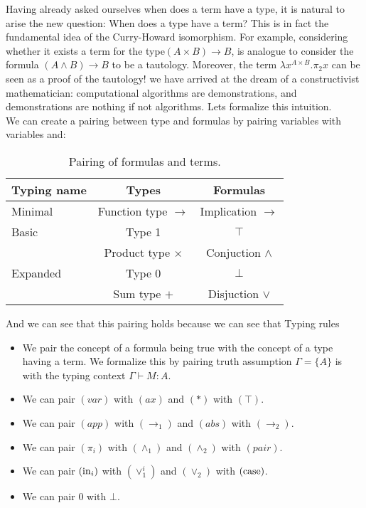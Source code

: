 Having already asked ourselves when does a term have a type, it is natural to arise the new question: When does a type have a term? This is in fact the fundamental idea of the Curry-Howard isomorphism. For example, considering whether it exists a term for the type$(A \times B) \to B$, is analogue to consider the formula $(A\land B)\to B$ to be a tautology. Moreover, the term $\lambda x^{A\times B}. \pi_2 x$ can be seen as a proof of the tautology! we have arrived at the dream of a constructivist mathematician: computational algorithms are demonstrations, and demonstrations are nothing if not algorithms. Lets formalize this intuition.\\


We can create a pairing between type and formulas by pairing variables with variables and:
\begin{table}[!h]
\begin{center}
\begin{tabular}{|l|c|c|}
\hline
  Typing name & Types  & Formulas  \\
  \hline
  Minimal     & Function type $\to$   & Implication $\to$  \\
  \hline 
  Basic      & Type 1 & $\top$ \\
             & Product type $\times$ & Conjuction $\land$ \\
  \hline
  Expanded   & Type 0 & $\bot$ \\
             & Sum type $+$     & Disjuction $\lor$ \\
\hline
\end{tabular}
\caption*{\label{tab:table-name} Pairing of formulas and terms.}
\end{center}
\end{table}

And we can see that this pairing holds because we can see that Typing rules 

\begin{itemize}
\item We pair the concept of a formula being true with the concept of a type having a term. We formalize this by pairing truth assumption $\Gamma=\{A\}$ is with the typing context $\Gamma\vdash M:A$. 
\item We can pair $(var)$ with $(ax)$ and $(*)$ with $(\top)$.
\item We can pair $(app)$ with $(\to_1)$ and $(abs)$ with $(\to_2)$.
\item We can pair $(\pi_i)$ with $(\land_1)$ and $(\land_2)$ with $(pair)$.
\item We can pair $(\operatorname{in}_i)$ with $(\lor_1^i)$ and $(\lor_2)$ with $(\operatorname{case})$.
\item We can pair $0$ with $\bot$.
\end{itemize}


